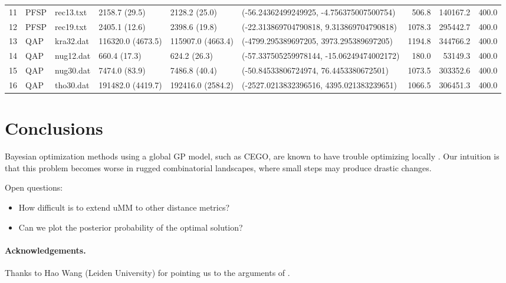\documentclass[runningheads]{llncs}
\begin{document}
{\begin{tabular}{llllllrrr}
11 &    PFSP &    rec13.txt &      2158.7 (29.5) &      2128.2 (25.0) &   (-56.24362499249925, -4.756375007500754) &        506.8 &      140167.2 &                400.0 \\
12 &    PFSP &    rec19.txt &      2405.1 (12.6) &      2398.6 (19.8) &   (-22.313869704790818, 9.313869704790818) &       1078.3 &      295442.7 &                400.0 \\
13 &     QAP &    kra32.dat &  116320.0 (4673.5) &  115907.0 (4663.4) &    (-4799.295389697205, 3973.295389697205) &       1194.8 &      344766.2 &                400.0 \\
14 &     QAP &    nug12.dat &       660.4 (17.3) &       624.2 (26.3) &  (-57.337505259978144, -15.06249474002172) &        180.0 &       53149.3 &                400.0 \\
15 &     QAP &    nug30.dat &      7474.0 (83.9) &      7486.8 (40.4) &     (-50.84533806724974, 76.4453380672501) &       1073.5 &      303352.6 &                400.0 \\
16 &     QAP &    tho30.dat &  191482.0 (4419.7) &  192416.0 (2584.2) &   (-2527.0213832396516, 4395.021383239651) &       1066.5 &      306451.3 &                400.0 \\
\bottomrule
\end{tabular}
}



\section{Conclusions}

Bayesian optimization methods using a global GP model, such as CEGO, are known
to have trouble optimizing locally \citep{EriPeaGar2019scalable}. Our
intuition is that this problem becomes worse in rugged combinatorial
landscapes, where small steps may produce drastic changes.

Open questions:
\begin{itemize}
\item How difficult is to extend uMM to other distance metrics?
\item Can we plot the posterior probability of the optimal solution?
\end{itemize}

\paragraph*{Acknowledgements.}

Thanks to Hao Wang (Leiden University) for pointing us to the arguments of
\citet{EriPeaGar2019scalable}.




\renewcommand{\doi}[1]{doi:\hspace{.16667em plus .08333em}\discretionary{}{}{}\href{https://doi.org/#1}{\urlstyle{rm}\nolinkurl{#1}}}


\end{document}
